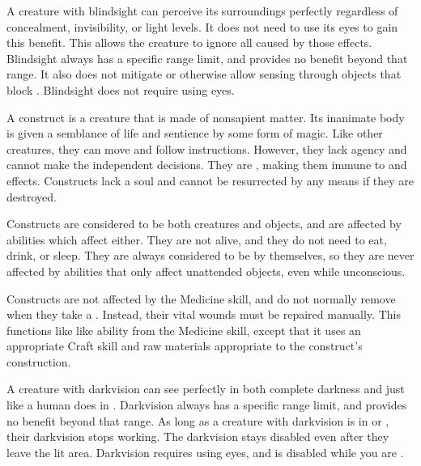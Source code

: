   A creature with blindsight can perceive its surroundings perfectly regardless of concealment, invisibility, or light levels.
  It does not need to use its eyes to gain this benefit.
  This allows the creature to ignore all  caused by those effects.
  Blindsight always has a specific range limit, and provides no benefit beyond that range.
  It also does not mitigate  or otherwise allow sensing through objects that block .
  Blindsight does not require using eyes.

    A construct is a creature that is made of nonsapient matter.
    Its inanimate body is given a semblance of life and sentience by some form of magic.
    Like other creatures, they can move and follow instructions.
    However, they lack agency and cannot make the independent decisions.
    They are , making them immune to  and  effects.
    Constructs lack a soul and cannot be resurrected by any means if they are destroyed.

    Constructs are considered to be both creatures and objects, and are affected by abilities which affect either.
    They are not alive, and they do not need to eat, drink, or sleep.
    They are always considered to be  by themselves, so they are never affected by abilities that only affect unattended objects, even while unconscious.

    Constructs are not affected by the Medicine skill, and do not normally remove  when they take a .
    Instead, their vital wounds must be repaired manually.
    This functions like like  ability from the Medicine skill, except that it uses an appropriate Craft skill and raw materials appropriate to the construct's construction.

  A creature with darkvision can see perfectly in both complete darkness and  just like a human does in .
  Darkvision always has a specific range limit, and provides no benefit beyond that range.
  As long as a creature with darkvision is in  or , their darkvision stops working.
  The darkvision  stays disabled even after they leave the lit area.
  Darkvision requires using eyes, and is disabled while you are \dazzled.

